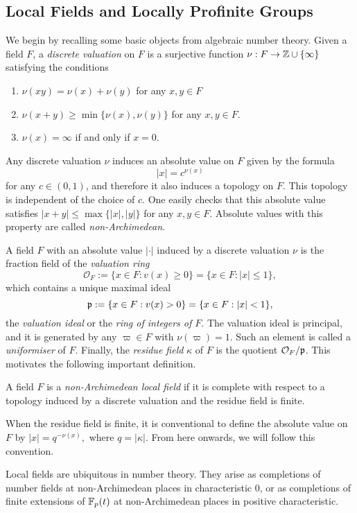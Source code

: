 
\subsection{Local Fields and Locally Profinite Groups}
We begin by recalling some basic objects from algebraic number theory. Given a field $F$, a \textit{discrete valuation} on $F$ is a surjective function $\nu: F\to\mathbb{Z}\cup\{\infty\}$ satisfying the conditions

\begin{enumerate}
    \item $\nu(xy)=\nu(x)+\nu(y)$ for any $x,y\in F$ 
    \item $\nu(x+y)\geq\min\{\nu(x),\nu(y)\}$ for any $x,y\in F$.
    \item $\nu(x)=\infty$ if and only if $x=0$.
\end{enumerate}

Any discrete valuation $\nu$ induces an absolute value on $F$ given by the formula 
$$|x|=c^{\nu(x)}$$ 
for any $c\in(0,1)$, and therefore it also induces a topology on $F$. This topology is independent of the choice of $c$. One easily checks that this absolute value satisfies $|x+y|\leq\max\{|x|,|y|\}$ for any $x,y\in F$. Absolute values with this property are called \textit{non-Archimedean}. 

A field $F$ with an absolute value $|\cdot|$ induced by a discrete valuation $\nu$ is the fraction field of the \textit{valuation ring}
$$\mathcal{O}_F:=\{x\in F:v(x)\geq 0\}=\{x\in F: |x|\leq1\},$$ 
which contains a unique maximal ideal
$$\mathfrak{p}:=\{x\in F:v(x)> 0\}=\{x\in F: |x|<1\},$$
the \textit{valuation ideal} or the \textit{ring of integers of $F$}. The valuation ideal is principal, and it is generated by any $\varpi\in F$ with $\nu(\varpi)=1$. Such an element is called a \textit{uniformiser} of $F$. Finally, the \textit{residue field} $\kappa$ of $F$ is the quotient $\mathcal{O}_F/\mathfrak{p}$. This motivates the following important definition.

\begin{defn}
    A field $F$ is a \textit{non-Archimedean local field} if it is complete with respect to a topology induced by a discrete valuation and the residue field is finite.
\end{defn}

\begin{rem}
    When the residue field is finite, it is conventional to define the absolute value on $F$ by 
    $|x|=q^{-\nu(x)},$
    where $q=|\kappa|$. From here onwards, we will follow this convention.
\end{rem}
\begin{rem}
    Local fields are ubiquitous in number theory. They arise as completions of number fields at non-Archimedean places in characteristic 0, or as completions of finite extensions of $\mathbb{F}_p(t)$ at non-Archimedean places in positive characteristic.
\end{rem}

